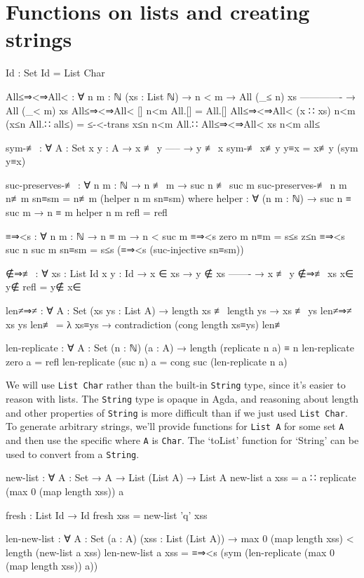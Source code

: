 \section{Functions on lists and creating strings}
\label{appendix:list_functions}
\begin{code}
  Id : Set
  Id = List Char

  All≤⇒<⇒All< : ∀ {n m : ℕ} (xs : List ℕ)
    → n < m
    → All (_≤ n) xs
      -------------
    → All (_< m) xs
  All≤⇒<⇒All< [] n<m All.[] = All.[]
  All≤⇒<⇒All< (x ∷ xs) n<m (x≤n All.∷ all≤) =
    ≤-<-trans x≤n n<m All.∷ All≤⇒<⇒All< xs n<m all≤

  sym-≢ : ∀ {A : Set} {x y : A}
    → x ≢ y
      -----
    → y ≢ x
  sym-≢ x≢y y≡x = x≢y (sym y≡x)

  suc-preserves-≢ : ∀ {n m : ℕ} → n ≢ m → suc n ≢ suc m
  suc-preserves-≢ {n} {m} n≢m sn≡sm = n≢m (helper n m sn≡sm)
    where
      helper : ∀ (n m : ℕ) → suc n ≡ suc m → n ≡ m
      helper n m refl = refl

  ≡⇒<s : ∀ {n m : ℕ} → n ≡ m → n < suc m
  ≡⇒<s {zero} {m} n≡m = s≤s z≤n
  ≡⇒<s {suc n} {suc m} sn≡sm = s≤s (≡⇒<s (suc-injective sn≡sm))

  ∉⇒≢ : ∀ {xs : List Id} {x y : Id}
    → x ∈ xs
    → y ∉ xs
      -------
    → x ≢ y
  ∉⇒≢ {xs} x∈ y∉ refl = y∉ x∈

  len≠⇒≠ : ∀ {A : Set} (xs ys : List A)
    → length xs ≢ length ys → xs ≢ ys
  len≠⇒≠ xs ys len≢ =
    λ xs≡ys → contradiction (cong length xs≡ys) len≢

  len-replicate : ∀ {A : Set} (n : ℕ) (a : A)
    → length (replicate n a) ≡ n
  len-replicate zero a = refl
  len-replicate (suc n) a = cong suc (len-replicate n a)
\end{code}

We will use \texttt{List Char} rather than the built-in \texttt{String} type, since it's easier to
reason with lists. The \texttt{String} type is opaque in Agda, and reasoning about length and other
properties of \texttt{String} is more difficult than if we just used \texttt{List Char}. To generate
arbitrary strings, we'll provide functions for \texttt{List A} for some set \texttt{A} and then use
the specific where \texttt{A} is \texttt{Char}. The `toList' function for `String' can be used to
convert from a \texttt{String}.

\begin{code}
  new-list : ∀ {A : Set} → A → List (List A) → List A
  new-list a xss = a ∷ replicate (max 0 (map length xss)) a

  fresh : List Id → Id
  fresh xss = new-list 'q' xss

  len-new-list : ∀ {A : Set} (a : A) (xss : List (List A))
    → max 0 (map length xss) < length (new-list a xss)
  len-new-list a xss =
    ≡⇒<s (sym (len-replicate (max 0 (map length xss)) a))
\end{code}

